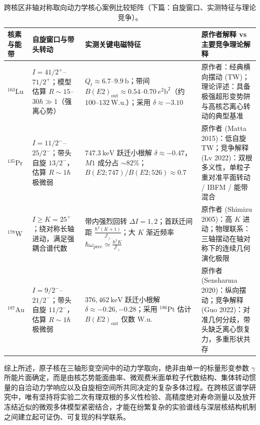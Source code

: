 \begin{table}[!htbp]
\centering
\small
\caption{跨核区非轴对称取向动力学核心案例比较矩阵（下篇：自旋窗口、实测特征与理论竞争）。}\label{tab:4-4-cross-region-comparison-b}
\begin{tabularx}{\textwidth}{p{2.1cm} p{3.0cm} p{4.3cm} >{\raggedright\arraybackslash}X}
\hline\hline
核素与能带 & 自旋窗口与带头转动 & 实测关键电磁特征 & 原作者解释 vs 主要竞争理论解释 \\
\hline
$^{163}\mathrm{Lu}$ & $I = 41/2^+$--$71/2^+$；模型估算 $R \sim 15$--$30\hbar \gg 1$（强离心势） & $Q_t \approx 6.7$--$9.9\ \mathrm{b}$；\newline 带间 $B(E2)_{\mathrm{out}} \approx 0.54$--$0.70\ e^2\mathrm{b}^2$（约 $100$--$132\ \mathrm{W.u.}$）；采用 $\delta \approx -3.10$ & 原作者：经典横向摆动 (TW)；\newline 理论评述：具备极强超形变势阱与高核芯离心转动的典型基准 \\
\hline
$^{135}\mathrm{Pr}$ & $I = 11/2^-$--$25/2^-$；带头自旋 $13/2^-$，估算 $R \sim 1\hbar$ 极微弱 & $747.3\ \mathrm{keV}$ 跃迁小根解 $\delta \approx -0.47$，$M1$ 成分占 $\sim 82\%$；$B(E2; 747)/B(E2; 526) \approx 0.7$ & 原作者 (Matta 2015)：低自旋 TW；\newline 竞争解释 (Lv 2022)：双根多义性，单粒子重对准平面转动 / IBFM / 能带混合 \\
\hline
$^{178}\mathrm{W}$ & $I \ge K = 25^+$；绕对称长轴进动，满足强耦合谱代数 & 带内强烈回转 $\Delta I = 1, 2$；首跃迁间距 $\frac{\hbar^2(K+1)}{\mathcal{J}_\perp}$；大 $K$ 渐近频率 $\hbar\omega_{\mathrm{prec}} \simeq \frac{\hbar^2 K}{\mathcal{J}_\perp}$ & 原作者 (Shimizu 2005)：高 $K$ 进动；\newline 物理联系：三轴摆动在轴对称下的连续几何演化极限 \\
\hline
$^{187}\mathrm{Au}$ & $I = 9/2^-$--$21/2^-$；带头自旋 $11/2^-$，估算 $R \sim 1\hbar$ 极微弱 & $376, 462\ \mathrm{keV}$ 跃迁小根解 $\delta \approx -0.26, -0.28$；采用 $^{186}\mathrm{Pt}$ 估计 $B(E2)_{\mathrm{out}}$ 仅数 W.u. & 原作者 (Sensharma 2020)：纵向摆动；\newline 竞争解释 (Guo 2022)：对准几何分歧，带头缺乏离心恢复力，多重形状共存 \\
\hline\hline
\end{tabularx}
\end{table}

综上所述，原子核在三轴形变空间中的动力学取向，绝非由单一的标量形变参数 $\gamma$ 所能片面确定，而是由核芯势能面曲率、微观费米面单粒子代数结构、集体转动惯量的自洽动力学响应以及自旋相空间所共同决定的复杂多体过程。在跨核区谱学研究中，唯有坚持将实验二次有理双根的多义性检验、高精度绝对寿命测量以及放开冻结近似的微观多体模型紧密结合，才能在纷繁复杂的实验谱线与深层核结构机制之间建立起可证伪、可复现的科学联系。
